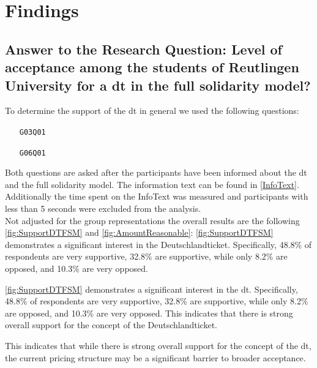 \pagebreak
\section{Findings}
\subsection{Answer to the Research Question: Level of acceptance among the students of Reutlingen University for a \gls{dt} in the full solidarity model?}
\begin{center}
\end{center}

To determine the support of the \gls{dt} in general we used the following questions:

\begin{enumerate}
    \item[\texttt{G03Q01}] 
    \item[\texttt{G06Q01}] 
\end{enumerate}
Both questions are asked after the participants have been informed about the \gls{dt} and the full solidarity model. The information text can be found in \ref{InfoText}. Additionally the time spent on the InfoText was measured and participants with less than 5 seconds were excluded from the analysis.\\
Not adjusted for the group representations the overall results are the following \ref{fig:SupportDTFSM} and \ref{fig:AmountReasonable}:
\ref{fig:SupportDTFSM} demonstrates a significant interest in the Deutschlandticket. Specifically, 48.8\% of respondents are very supportive, 32.8\% are supportive, while only 8.2\% are opposed, and 10.3\% are very opposed.

\ref{fig:SupportDTFSM} demonstrates a significant interest in the \gls{dt}. Specifically, 48.8\% of respondents are very supportive, 32.8\% are supportive, while only 8.2\% are opposed, and 10.3\% are very opposed. This indicates that there is strong overall support for the concept of the Deutschlandticket.

This indicates that while there is strong overall support for the concept of the \gls{dt}, the current pricing structure may be a significant barrier to broader acceptance.


